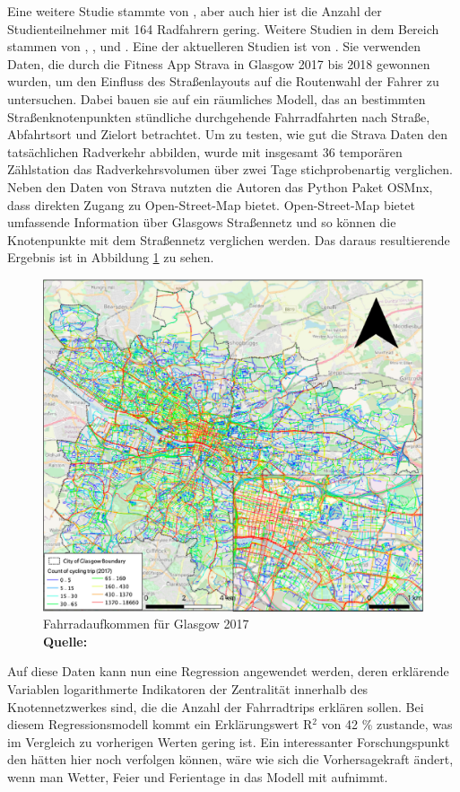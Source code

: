 \documentclass[a4paper,12pt]{thesis}
\newcommand*{\captionsource}[2]{%
	\caption[{#1}]{%
		#1%
		\\\hspace{\linewidth}%
		\textbf{Quelle:} #2%
	}%
}
\begin{document}
Eine weitere Studie stammte von \cite{Broach2012}, aber auch hier ist die Anzahl der Studienteilnehmer mit 164 Radfahrern gering. Weitere Studien in dem Bereich stammen von \cite{Musakwa2016}, \cite{Pritchard2018}, \cite{Lee2020} und \cite{Alattar2021}. Eine der aktuelleren Studien ist von \cite{Alattar2021}. Sie verwenden Daten, die durch die Fitness App Strava in Glasgow 2017 bis 2018 gewonnen wurden, um den Einfluss des Straßenlayouts auf die Routenwahl der Fahrer zu untersuchen. Dabei bauen sie auf ein räumliches Modell, das an bestimmten Straßenknotenpunkten stündliche durchgehende Fahrradfahrten nach Straße, Abfahrtsort und Zielort betrachtet. Um zu testen, wie gut die Strava Daten den tatsächlichen Radverkehr abbilden, wurde mit insgesamt 36 temporären Zählstation das Radverkehrsvolumen über zwei Tage stichprobenartig verglichen. Neben den Daten von Strava nutzten die Autoren das Python Paket OSMnx, dass direkten Zugang zu Open-Street-Map bietet. Open-Street-Map bietet umfassende Information über Glasgows Straßennetz und so können die Knotenpunkte mit dem Straßennetz verglichen werden. Das daraus resultierende Ergebnis ist in Abbildung \ref{Alattar_2021} zu sehen.
\begin{figure}[!ht]
	\centering
	\includegraphics[width=\textwidth]{Plots/Alattar2021.png}
	\captionsource{Fahrradaufkommen für Glasgow 2017}{
		\cite{Alattar2021}
	}
	\label{Alattar_2021}
\end{figure}
Auf diese Daten kann nun eine Regression angewendet werden, deren erklärende Variablen logarithmerte Indikatoren der Zentralität innerhalb des Knotennetzwerkes sind, die die Anzahl der Fahrradtrips erklären sollen. Bei diesem Regressionsmodell kommt ein Erklärungswert R$^2$ von 42 \% zustande, was im Vergleich zu vorherigen Werten gering ist. Ein interessanter Forschungspunkt den \cite{Alattar2021} hätten hier noch verfolgen können, wäre wie sich die Vorhersagekraft ändert, wenn man Wetter, Feier und Ferientage in das Modell mit aufnimmt.\\
\end{document}
